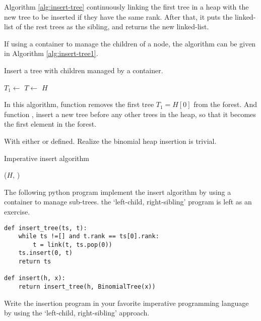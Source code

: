 \documentclass{article}
\begin{document}
Algorithm \ref{alg:insert-tree} continuously linking the first tree
in a heap with the new tree to be inserted if they have the same rank.
After that, it puts the linked-list of the rest trees as the sibling,
and returns the new linked-list.

If using a container to manage the children of a node, the algorithm
can be given in Algorithm \ref{alg:insert-tree1}.

\begin{algorithm}
\caption{Insert a tree with children managed by a container.}
\label{alg:insert-tree1}
\begin{algorithmic}[1]
    \State $T_1 \gets$ 
    \State $T \gets $ 
  \EndWhile
  \State {}
  \State \Return $H$
\EndFunction
\end{algorithmic}
\end{algorithm}

In this algorithm, function  removes the first tree
$T_1 = H[0]$ from the forest. And function ,
insert a new tree before any other trees in the heap, so that it 
becomes the first element in the forest.

With either  or  defined.
Realize the binomial heap insertion is trivial.

\begin{algorithm}
\caption{Imperative insert algorithm}
\label{alg:bheap-insert}
\begin{algorithmic}[1]
  \State \Return {}($H$, )
\EndFunction
\end{algorithmic}
\end{algorithm}

The following python program implement the insert algorithm by using
a container to manage sub-trees. the `left-child, right-sibling' program
is left as an exercise.

\lstset{language=Python}
\begin{lstlisting}
def insert_tree(ts, t):
    while ts !=[] and t.rank == ts[0].rank:
        t = link(t, ts.pop(0))
    ts.insert(0, t)
    return ts

def insert(h, x):
    return insert_tree(h, BinomialTree(x))
\end{lstlisting}

\begin{Exercise}
Write the insertion program in your favorite imperative programming 
language by using the `left-child, right-sibling' approach.
\end{Exercise}
\end{document}
